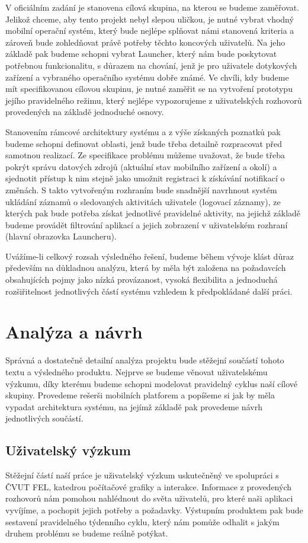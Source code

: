 \documentclass[thesis=M,czech]{FITthesis}[2012/06/26]
\begin{document}
\begin{introduction}
V oficiálním zadání je stanovena cílová skupina, na kterou se budeme zaměřovat. Jelikož chceme, aby tento projekt nebyl slepou uličkou, je nutné vybrat vhodný mobilní operační systém, který bude nejlépe splňovat námi stanovená kriteria a zároveň bude zohledňovat právě potřeby těchto koncových uživatelů. Na jeho základě pak budeme schopni vybrat Launcher, který nám bude poskytovat potřebnou funkcionalitu, s důrazem na chování, jenž je pro uživatele dotykových zařízení a vybraného operačního systému dobře známé. Ve chvíli, kdy budeme mít specifikovanou cílovou skupinu, je nutné zaměřit se na vytvoření prototypu jejího pravidelného režimu, který nejlépe vypozorujeme z uživatelských rozhovorů provedených na základě jednoduché osnovy.

Stanovením rámcové architektury systému a z výše získaných poznatků pak budeme schopni definovat oblasti, jenž bude třeba detailně rozpracovat před samotnou realizací. Ze specifikace problému můžeme uvažovat, že bude třeba pokrýt správu datových zdrojů (aktuální stav mobilního zařízení a okolí) a sjednotit přístup k nim stejně jako umožnit registraci k získávání notifikací o změnách. S takto vytvořeným rozhraním bude snadnější navrhnout systém ukládání záznamů o sledovaných aktivitách uživatele (logovací záznamy), ze kterých pak bude potřeba získat jednotlivé pravidelné aktivity, na jejichž základě budeme provádět filtrování aplikací a jejich zobrazení v uživatelském rozhraní (hlavní obrazovka Launcheru). 

Uvážíme-li celkový rozsah výsledného řešení, budeme během vývoje klást důraz především na důkladnou analýzu, která by měla být založena na požadavcích obsahujících pojmy jako nízká provázanost, vysoká flexibilita a jednoduchá rozšiřitelnost jednotlivých částí systému vzhledem k předpokládané další práci.
\end{introduction}

\chapter{Analýza a návrh}
Správná a dostatečně detailní analýza projektu bude stěžejní součástí tohoto textu a výsledného produktu. Nejprve se budeme věnovat uživatelskému výzkumu, díky kterému budeme schopni modelovat pravidelný cyklus naší cílové skupiny. Provedeme rešerši mobilních platforem a popíšeme si jak by měla vypadat architektura systému, na jejímž základě pak provedeme návrh jednotlivých součástí.

\section{Uživatelský výzkum}
Stěžejní částí naší práce je uživatelský výzkum uskutečněný ve spolupráci s ČVUT FEL, katedrou počítačové grafiky a interakce. Informace z provedených rozhovorů nám pomohou nahlédnout do světa uživatelů, pro které naši aplikaci vyvíjíme, a pochopit jejich potřeby a požadavky. Výstupním produktem pak bude sestavení pravidelného týdenního cyklu, který nám pomůže odhalit s jakým druhem problému se budeme reálně potýkat.
\end{document}
